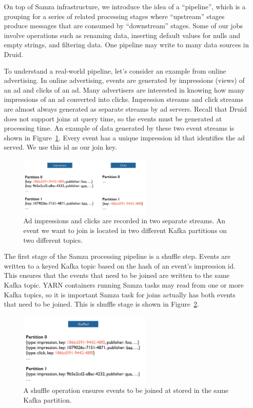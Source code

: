\documentclass{vldb}
\begin{document}
On top of Samza infrastructure, we introduce the idea of a “pipeline”, which is
a grouping for a series of related processing stages where “upstream” stages
produce messages that are consumed by “downstream” stages. Some of our jobs
involve operations such as renaming data, inserting default values for nulls
and empty strings, and filtering data. One pipeline may write to many data
sources in Druid.

To understand a real-world pipeline, let's consider an example from online
advertising. In online advertising, events are generated by impressions (views)
of an ad and clicks of an ad. Many advertisers are interested in knowing how
many impressions of an ad converted into clicks. Impression streams and click
streams are almost always generated as separate streams by ad servers. Recall
that Druid does not support joins at query time, so the events must be
generated at processing time. An example of data generated by these two event
streams is shown in Figure~\ref{fig:imps_clicks}. Every event has a unique
impression id that identifies the ad served. We use this id as our join key.

\begin{figure}
\centering
\includegraphics[width = 2.6in]{imps_clicks} 
\caption{ 
Ad impressions
and clicks are recorded in two separate streams. An event we want to join is
located in two different Kafka partitions on two different topics.  
}
\label{fig:imps_clicks}
\end{figure}

The first stage of the Samza processing pipeline is a shuffle step. Events are
written to a keyed Kafka topic based on the hash of an event's impression id.
This ensures that the events that need to be joined are written to the same
Kafka topic. YARN containers running Samza tasks may read from one or more
Kafka topics, so it is important Samza task for joins actually has both events
that need to be joined. This is shuffle stage is shown in
Figure~\ref{fig:shuffled}.

\begin{figure}
\centering
\includegraphics[width = 2.6in]{shuffled}
\caption{
A shuffle operation ensures events to be joined at stored in the same Kafka
partition.
}
\label{fig:shuffled}
\end{figure}
\end{document}
